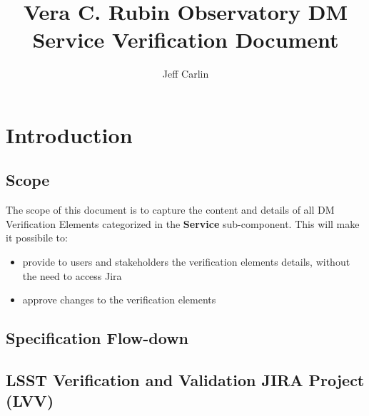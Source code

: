 \documentclass[DM,lsstdraft,STS,toc]{lsstdoc}
\begin{document}
\providecommand{\tightlist}{%
  \setlength{\itemsep}{0pt}\setlength{\parskip}{0pt}}

\def\product{LSST Data Management}


\title[DM Infrastructure Verification Document]{Vera C. Rubin Observatory DM Service Verification Document}

\author{Jeff Carlin}
\setDocRef{\lsstDocType-\lsstDocNum}
\setDocDate{\vcsDate}



\setDocUpstreamVersion{\vcsRevision}

\maketitle


\section{Introduction}\label{sec:intro}


\subsection{Scope}\label{sec:scope}

The scope of this document is to capture the content and details of all DM Verification Elements
categorized in the \textbf{Service} sub-component. This will make it possibile to:

\begin{itemize}
\item provide to users and stakeholders the verification elements details, without the need to access Jira
\item approve changes to the verification elements
\end{itemize}

\subsection{Specification Flow-down}\label{sec:sepcflowd}


\subsection{LSST Verification and Validation JIRA Project (LVV)}\label{sec:lvv}
\end{document}
